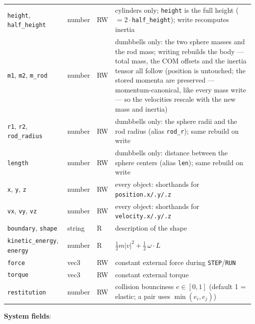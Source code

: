 \documentclass[11pt]{article}
\newcommand{\kw}[1]{\texttt{\uppercase{#1}}}
\newcommand{\code}[1]{\texttt{#1}}
\begin{document}
\begin{longtable}{lllp{6.4cm}}
\code{height}, \code{half\_height} & number & RW & cylinders only; \code{height} is the full height ($= 2\cdot$\code{half\_height}); write recomputes inertia\\
\code{m1}, \code{m2}, \code{m\_rod} & number & RW & dumbbells only: the two sphere masses and the rod mass; writing rebuilds the body --- total mass, the COM offsets and the inertia tensor all follow (position is untouched; the stored momenta are preserved --- momentum-canonical, like every mass write --- so the velocities rescale with the new mass and inertia)\\
\code{r1}, \code{r2}, \code{rod\_radius} & number & RW & dumbbells only: the sphere radii and the rod radius (alias \code{rod\_r}); same rebuild on write\\
\code{length} & number & RW & dumbbells only: distance between the sphere centers (alias \code{len}); same rebuild on write\\
\code{x}, \code{y}, \code{z} & number & RW & every object: shorthands for \code{position.x/.y/.z}\\
\code{vx}, \code{vy}, \code{vz} & number & RW & every object: shorthands for \code{velocity.x/.y/.z}\\
\code{boundary}, \code{shape} & string & R & description of the shape\\
\code{kinetic\_energy}, \code{energy} & number & R & $\tfrac12 m|v|^2 + \tfrac12\,\omega\!\cdot\!L$\\
\code{force} & vec3 & RW & constant external force during \kw{step}/\kw{run}\\
\code{torque} & vec3 & RW & constant external torque\\
\code{restitution} & number & RW & collision bounciness $e \in [0,1]$ (default 1 = elastic; a pair uses $\min(e_i, e_j)$)\\
\end{longtable}

\textbf{System fields}:
\end{document}
